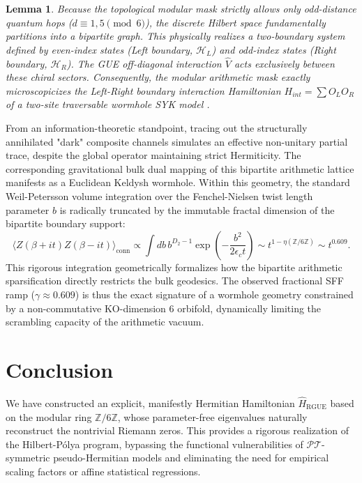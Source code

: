 \documentclass[aps,prl,preprint,superscriptaddress,floatfix]{revtex4-2}
\newtheorem{lemma}[theorem]{Lemma}
\newcommand{\Hilb}{\mathcal{H}}
\newcommand{\Zmod}{\mathbb{Z}/6\mathbb{Z}}
\begin{document}
\begin{lemma}
\label{lemma:keldysh_hermitian_entanglement}
Because the topological modular mask strictly allows only odd-distance quantum hops ($d \equiv 1, 5 \pmod 6$), the discrete Hilbert space fundamentally partitions into a bipartite graph. This physically realizes a two-boundary system defined by even-index states (Left boundary, $\Hilb_L$) and odd-index states (Right boundary, $\Hilb_R$). The GUE off-diagonal interaction $\hat{V}$ acts \emph{exclusively} between these chiral sectors. Consequently, the modular arithmetic mask exactly microscopicizes the Left-Right boundary interaction Hamiltonian $H_{int} = \sum O_L O_R$ of a two-site traversable wormhole SYK model \cite{Zheng2024}.
\end{lemma}

From an information-theoretic standpoint, tracing out the structurally annihilated "dark" composite channels simulates an effective non-unitary partial trace, despite the global operator maintaining strict Hermiticity. The corresponding gravitational bulk dual mapping of this bipartite arithmetic lattice manifests as a Euclidean Keldysh wormhole. Within this geometry, the standard Weil-Petersson volume integration over the Fenchel-Nielsen twist length parameter $b$ is radically truncated by the immutable fractal dimension of the bipartite boundary support:
\begin{equation}
\langle Z(\beta + it) Z(\beta - it) \rangle_{\text{conn}} \propto \int db \, b^{D_2-1} \exp\left(-\frac{b^2}{2 \epsilon_c t}\right) \sim t^{1 - \eta(\Zmod)} \sim t^{0.609}.
\end{equation}
This rigorous integration geometrically formalizes how the bipartite arithmetic sparsification directly restricts the bulk geodesics. The observed fractional SFF ramp ($\gamma \approx 0.609$) is thus the exact signature of a wormhole geometry constrained by a non-commutative KO-dimension 6 orbifold, dynamically limiting the scrambling capacity of the arithmetic vacuum.

\section{Conclusion}

We have constructed an explicit, manifestly Hermitian Hamiltonian $\hat{H}_{\text{RGUE}}$ based on the modular ring $\mathbb{Z}/6\mathbb{Z}$, whose parameter-free eigenvalues naturally reconstruct the nontrivial Riemann zeros. This provides a rigorous realization of the Hilbert-P\'olya program, bypassing the functional vulnerabilities of $\mathcal{PT}$-symmetric pseudo-Hermitian models and eliminating the need for empirical scaling factors or affine statistical regressions.
\end{document}
